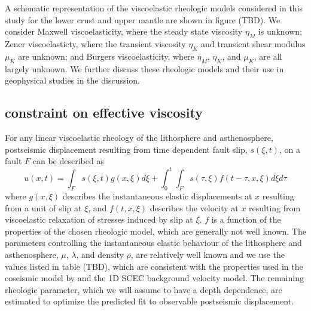 \documentclass[12pt]{article}
\begin{document}
A schematic representation of the viscoelastic rheologic models considered in this study for the lower crust and upper mantle are shown in figure (TBD).  We consider Maxwell viscoelasticity, where the steady state viscosity $\eta_M$ is unknown; Zener viscoelasticty, where the transient viscosity $\eta_K$ and transient shear modulus $\mu_K$ are unknown; and Burgers viscoelasticity, where $\eta_M$, $\eta_K$, and $\mu_K$, are all largely unknown. We further discuss these rheologic models and their use in geophysical studies in the discussion. 

\subsection*{constraint on effective viscosity}\label{InitialInversion}
For any linear viscoelastic rheology of the lithosphere and asthenosphere, postseismic displacement resulting from time dependent fault slip, $s(\xi,t)$, on a fault $F$ can be described as  
\begin{equation}\label{GeneralForward}
  u(x,t) = \int_F s(\xi,t)g(x,\xi)d\xi + 
           \int_0^t\int_F s(\tau,\xi) f(t-\tau,x,\xi) d\xi d\tau
\end{equation}
where $g(x,\xi)$ describes the instantaneous elastic displacements at $x$ resulting from a unit of slip at $\xi$, and $f(t,x,\xi)$ describes the velocity at $x$ resulting from viscoelastic relaxation of stresses induced by slip at $\xi$. $f$ is a function of the properties of the chosen rheologic model, which are generally not well known.  The parameters controlling the instantaneous elastic behaviour of the lithosphere and asthenosphere, $\mu$, $\lambda$, and density $\rho$, are relatively well known and we use the values listed in table (TBD), which are consistent with the properties used in the coseismic model by \cite{Wei2011} and the 1D SCEC background velocity model.  The remaining rheologic parameter, which we will assume to have a depth dependence, are estimated to optimize the predicted fit to observable postseismic displacement.
\end{document}
